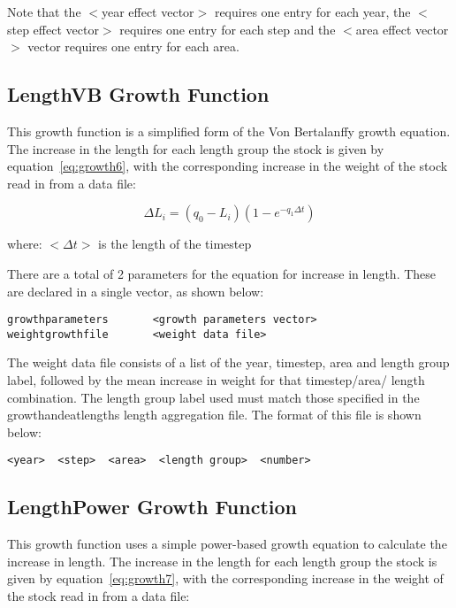 \documentclass [a4paper, 10pt]{book}
\begin{document}
Note that the $<$year effect vector$>$ requires one entry for each year, the $<$step effect vector$>$ requires one entry for each step and the $<$area effect vector$>$ vector requires one entry for each area.

\newpage %
\subsection{LengthVB Growth Function}\label{subsec:growth6}
This growth function is a simplified form of the Von Bertalanffy growth equation.  The increase in the length for each length group the stock is given by equation~\ref{eq:growth6}, with the corresponding increase in the weight of the stock read in from a data file:

\begin{equation}\label{eq:growth6}
\Delta L_{i} = \left( q_{0} - L_{i} \right) \left( 1 - e^{-q_{1} \Delta t} \right)
\end{equation}

where:\newline
$<\Delta t>$ is the length of the timestep

\bigskip
There are a total of 2 parameters for the equation for increase in length.  These are declared in a single vector, as shown below:

{\small\begin{verbatim}
growthparameters       <growth parameters vector>
weightgrowthfile       <weight data file>
\end{verbatim}}

The weight data file consists of a list of the year, timestep, area  and length group label, followed by the mean increase in weight for that timestep/area/ length combination.  The length group label used must match those specified in the growthandeatlengths length aggregation file.  The format of this file is shown below:

{\small\begin{verbatim}
<year>  <step>  <area>  <length group>  <number>
\end{verbatim}}

\subsection{LengthPower Growth Function}\label{subsec:growth7}
This growth function uses a simple power-based growth equation to calculate the increase in length.  The increase in the length for each length group the stock is given by equation~\ref{eq:growth7}, with the corresponding increase in the weight of the stock read in from a data file:
\end{document}
